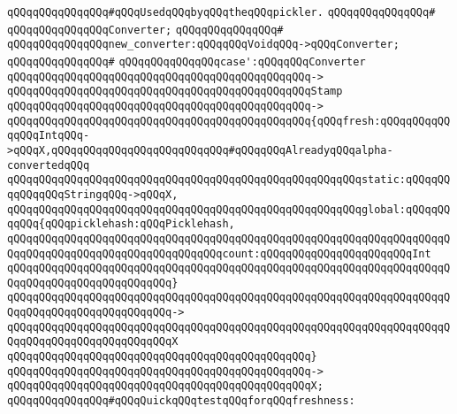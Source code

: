 \verb|qQQqqQQqqQQqqQQq#qQQqUsedqQQqbyqQQqtheqQQqpickler.|\newline
\verb|qQQqqQQqqQQqqQQq#|\newline
\verb|qQQqqQQqqQQqqQQqConverter;|\newline
\verb|qQQqqQQqqQQqqQQq#|\newline
\verb|qQQqqQQqqQQqqQQqnew_converter:qQQqqQQqVoidqQQq->qQQqConverter;|\newline
\verb|qQQqqQQqqQQqqQQq#|\newline
\verb|qQQqqQQqqQQqqQQqcase':qQQqqQQqConverter|\newline
\verb|qQQqqQQqqQQqqQQqqQQqqQQqqQQqqQQqqQQqqQQqqQQqqQQq->|\newline
\verb|qQQqqQQqqQQqqQQqqQQqqQQqqQQqqQQqqQQqqQQqqQQqqQQqStamp|\newline
\verb|qQQqqQQqqQQqqQQqqQQqqQQqqQQqqQQqqQQqqQQqqQQqqQQq->|\newline
\verb|qQQqqQQqqQQqqQQqqQQqqQQqqQQqqQQqqQQqqQQqqQQqqQQq{qQQqfresh:qQQqqQQqqQQqqQQqIntqQQq->qQQqX,qQQqqQQqqQQqqQQqqQQqqQQqqQQq#qQQqqQQqAlreadyqQQqalpha-convertedqQQq|\newline
\verb|qQQqqQQqqQQqqQQqqQQqqQQqqQQqqQQqqQQqqQQqqQQqqQQqqQQqqQQqstatic:qQQqqQQqqQQqqQQqStringqQQq->qQQqX,|\newline
\verb|qQQqqQQqqQQqqQQqqQQqqQQqqQQqqQQqqQQqqQQqqQQqqQQqqQQqqQQqglobal:qQQqqQQqqQQq{qQQqpicklehash:qQQqPicklehash,|\newline
\verb|qQQqqQQqqQQqqQQqqQQqqQQqqQQqqQQqqQQqqQQqqQQqqQQqqQQqqQQqqQQqqQQqqQQqqQQqqQQqqQQqqQQqqQQqqQQqqQQqqQQqqQQqcount:qQQqqQQqqQQqqQQqqQQqqQQqInt|\newline
\verb|qQQqqQQqqQQqqQQqqQQqqQQqqQQqqQQqqQQqqQQqqQQqqQQqqQQqqQQqqQQqqQQqqQQqqQQqqQQqqQQqqQQqqQQqqQQqqQQq}|\newline
\verb|qQQqqQQqqQQqqQQqqQQqqQQqqQQqqQQqqQQqqQQqqQQqqQQqqQQqqQQqqQQqqQQqqQQqqQQqqQQqqQQqqQQqqQQqqQQqqQQq->|\newline
\verb|qQQqqQQqqQQqqQQqqQQqqQQqqQQqqQQqqQQqqQQqqQQqqQQqqQQqqQQqqQQqqQQqqQQqqQQqqQQqqQQqqQQqqQQqqQQqqQQqX|\newline
\verb|qQQqqQQqqQQqqQQqqQQqqQQqqQQqqQQqqQQqqQQqqQQqqQQq}|\newline
\verb|qQQqqQQqqQQqqQQqqQQqqQQqqQQqqQQqqQQqqQQqqQQqqQQq->|\newline
\verb|qQQqqQQqqQQqqQQqqQQqqQQqqQQqqQQqqQQqqQQqqQQqqQQqX;|\newline
\newline
\newline
\verb|qQQqqQQqqQQqqQQq#qQQqQuickqQQqtestqQQqforqQQqfreshness:|\newline
